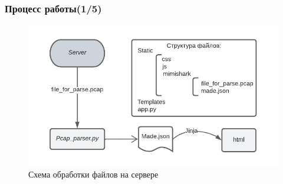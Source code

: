 \documentclass[aspectratio=169]{beamer}
\newtheorem{rutheorem}{Теорема}
\begin{document}




\begin{frame}
	\frametitle{Процесс работы(1/5)}
	\begin{figure}[h]

	\centering
		
	\includegraphics[width=0.8\linewidth]{Scheme_of_project.png}
		
	\caption{Схема обработки файлов на сервере}
		
	\label{fig:mpr}
		
\end{figure}
\end{frame}
\end{document}
